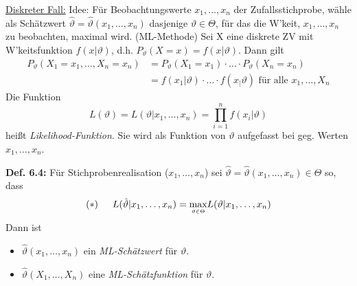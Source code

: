 \documentclass[a4paper,11pt]{article}
\begin{document}
\vspace{4pt}
\noindent\underline{Diskreter Fall:}
\newline Idee: Für Beobachtungswerte $x_1,\dots,x_n$ der Zufallsstichprobe, 
wähle als Schätzwert $\hat{\vartheta}=\hat{\vartheta}(x_1,\dots,x_n)$ dasjenige $\vartheta\in\Theta$, für das die W'keit, $x_1,\dots,x_n$ zu beobachten, maximal wird. (ML-Methode)
\newline Sei X eine diskrete ZV mit W'keitsfunktion $f(x|\vartheta)$, d.h. $P_\vartheta(X=x)=f(x|\vartheta)$.
\newline Dann gilt
\begin{align*}
P_\vartheta(X_1=x_1,\dots,X_n=x_n) &= P_\vartheta(X_1=x_1)\cdot\dots\cdot P_\vartheta(X_n=x_n)\\
&= f(x_1|\vartheta)\cdot\dots\cdot f(x_|\vartheta) \text{ für alle } x_1,\dots,X_n
\end{align*} 
Die Funktion
\[L(\vartheta)=L(\vartheta|x_1,\dots,x_n)=\prod_{i=1}^{n}f(x_i|\vartheta)\]
heißt \textit{Likelihood-Funktion}. Sie wird als Funktion von $\vartheta$ aufgefasst bei geg. Werten $x_1,\dots,x_n$.

\vspace{6pt}
\noindent\textbf{Def. 6.4:}
Für Stichprobenrealisation ($x_1,\dots,x_n$) sei $\hat{\vartheta}=\hat{\vartheta}(x_1,\dots,x_n)\in\Theta$ so, dass
\[(*)\hspace{15pt} L(\hat{\vartheta}|x_1,\dots,x_n)=\underset{\mathclap{\scriptscriptstyle \vartheta\in\Theta}}{\text{max}}L(\vartheta|x_1,\dots,x_n)\]
Dann ist 
\begin{itemize}
\item[] $\hat{\vartheta}(x_1,\dots,x_n)$ ein \textit{ML-Schätzwert} für $\vartheta$.
\item[] $\hat{\vartheta}(X_1,\dots,X_n)$ eine \textit{ML-Schätzfunktion} für $\vartheta$. 
\end{itemize}
\end{document}
